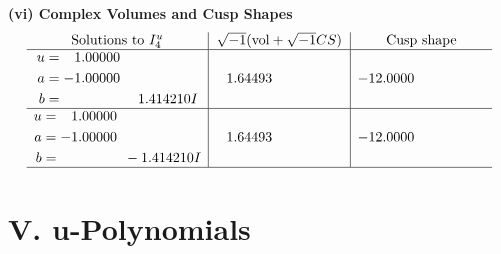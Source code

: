 \documentclass[1p]{elsarticle_modified}
\theoremstyle{definition}
\newcommand{\I}{\sqrt{-1}}
\begin{document}
\newpage\flushleft \textbf{(vi) Complex Volumes and Cusp Shapes}
$$\begin{array}{c|c|c}  
\text{Solutions to }I^u_{4}& \I (\text{vol} + \sqrt{-1}CS) & \text{Cusp shape}\\
 \hline 
\begin{aligned}
u &= \phantom{-}1.00000\phantom{ +0.000000I} \\
a &= -1.00000\phantom{ +0.000000I} \\
b &= \phantom{-0.000000 -}1.414210 I\end{aligned}
 & \phantom{-}1.64493\phantom{ +0.000000I} & -12.0000\phantom{ +0.000000I} \\ \hline\begin{aligned}
u &= \phantom{-}1.00000\phantom{ +0.000000I} \\
a &= -1.00000\phantom{ +0.000000I} \\
b &= \phantom{-0.000000 } -1.414210 I\end{aligned}
 & \phantom{-}1.64493\phantom{ +0.000000I} & -12.0000\phantom{ +0.000000I}\\
 \hline 
 \end{array}$$\newpage
\newpage\renewcommand{\arraystretch}{1}
\centering \section*{ V. u-Polynomials}
\end{document}
